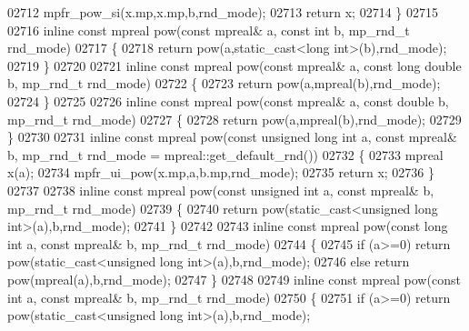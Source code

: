 \begin{DoxyCode}
{{02712     mpfr\_pow\_si(x.mp,x.mp,b,rnd\_mode);
02713     \textcolor{keywordflow}{return} x;
02714 \}
02715 
02716 \textcolor{keyword}{inline} \textcolor{keyword}{const} mpreal pow(\textcolor{keyword}{const} mpreal& a, \textcolor{keyword}{const} \textcolor{keywordtype}{int} b, mp\_rnd\_t rnd\_mode)
02717 \{
02718     \textcolor{keywordflow}{return} pow(a,static\_cast<long int>(b),rnd\_mode);
02719 \}
02720 
02721 \textcolor{keyword}{inline} \textcolor{keyword}{const} mpreal pow(\textcolor{keyword}{const} mpreal& a, \textcolor{keyword}{const} \textcolor{keywordtype}{long} \textcolor{keywordtype}{double} b, mp\_rnd\_t rnd\_mode)
02722 \{
02723     \textcolor{keywordflow}{return} pow(a,mpreal(b),rnd\_mode);
02724 \}
02725 
02726 \textcolor{keyword}{inline} \textcolor{keyword}{const} mpreal pow(\textcolor{keyword}{const} mpreal& a, \textcolor{keyword}{const} \textcolor{keywordtype}{double} b, mp\_rnd\_t rnd\_mode)
02727 \{
02728     \textcolor{keywordflow}{return} pow(a,mpreal(b),rnd\_mode);
02729 \}
02730 
02731 \textcolor{keyword}{inline} \textcolor{keyword}{const} mpreal pow(\textcolor{keyword}{const} \textcolor{keywordtype}{unsigned} \textcolor{keywordtype}{long} \textcolor{keywordtype}{int} a, \textcolor{keyword}{const} mpreal& b, mp\_rnd\_t rnd\_mode = 
      mpreal::get\_default\_rnd())
02732 \{
02733     mpreal x(a);
02734     mpfr\_ui\_pow(x.mp,a,b.mp,rnd\_mode);
02735     \textcolor{keywordflow}{return} x;
02736 \}
02737 
02738 \textcolor{keyword}{inline} \textcolor{keyword}{const} mpreal pow(\textcolor{keyword}{const} \textcolor{keywordtype}{unsigned} \textcolor{keywordtype}{int} a, \textcolor{keyword}{const} mpreal& b, mp\_rnd\_t rnd\_mode)
02739 \{
02740     \textcolor{keywordflow}{return} pow(static\_cast<unsigned long int>(a),b,rnd\_mode);
02741 \}
02742 
02743 \textcolor{keyword}{inline} \textcolor{keyword}{const} mpreal pow(\textcolor{keyword}{const} \textcolor{keywordtype}{long} \textcolor{keywordtype}{int} a, \textcolor{keyword}{const} mpreal& b, mp\_rnd\_t rnd\_mode)
02744 \{
02745     \textcolor{keywordflow}{if} (a>=0)     \textcolor{keywordflow}{return} pow(static\_cast<unsigned long int>(a),b,rnd\_mode);
02746     \textcolor{keywordflow}{else}          \textcolor{keywordflow}{return} pow(mpreal(a),b,rnd\_mode);
02747 \}
02748 
02749 \textcolor{keyword}{inline} \textcolor{keyword}{const} mpreal pow(\textcolor{keyword}{const} \textcolor{keywordtype}{int} a, \textcolor{keyword}{const} mpreal& b, mp\_rnd\_t rnd\_mode)
02750 \{
02751     \textcolor{keywordflow}{if} (a>=0)     \textcolor{keywordflow}{return} pow(static\_cast<unsigned long int>(a),b,rnd\_mode);
}}
\end{DoxyCode}
